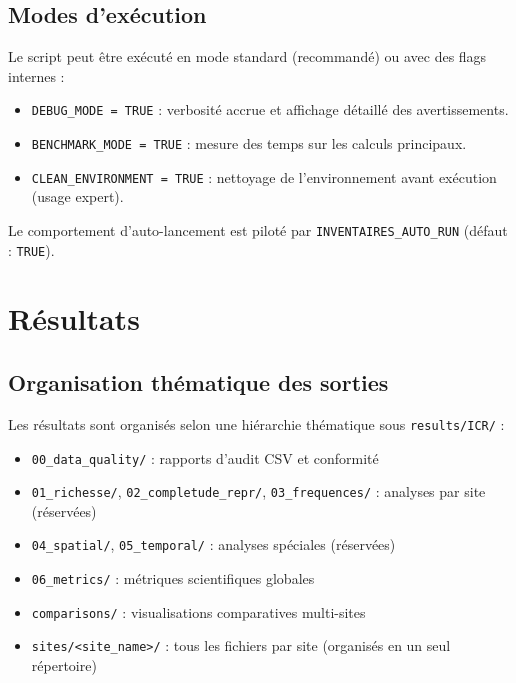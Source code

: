 \documentclass[11pt,a4paper]{article}
\begin{document}
\subsection{Modes d'exécution}
Le script peut être exécuté en mode standard (recommandé) ou avec des flags internes :
\begin{itemize}
  \item \texttt{DEBUG\_MODE = TRUE} : verbosité accrue et affichage détaillé des avertissements.
  \item \texttt{BENCHMARK\_MODE = TRUE} : mesure des temps sur les calculs principaux.
  \item \texttt{CLEAN\_ENVIRONMENT = TRUE} : nettoyage de l'environnement avant exécution (usage expert).
\end{itemize}
Le comportement d'auto-lancement est piloté par \texttt{INVENTAIRES\_AUTO\_RUN} (défaut : \texttt{TRUE}).

\section{Résultats}

\subsection{Organisation thématique des sorties}
Les résultats sont organisés selon une hiérarchie thématique sous \texttt{results/ICR/} :

\begin{itemize}
  \item \texttt{00\_data\_quality/} : rapports d'audit CSV et conformité
  \item \texttt{01\_richesse/}, \texttt{02\_completude\_repr/}, \texttt{03\_frequences/} : analyses par site (réservées)
  \item \texttt{04\_spatial/}, \texttt{05\_temporal/} : analyses spéciales (réservées)
  \item \texttt{06\_metrics/} : métriques scientifiques globales
  \item \texttt{comparisons/} : visualisations comparatives multi-sites
  \item \texttt{sites/<site\_name>/} : tous les fichiers par site (organisés en un seul répertoire)
\end{itemize}
\end{document}
